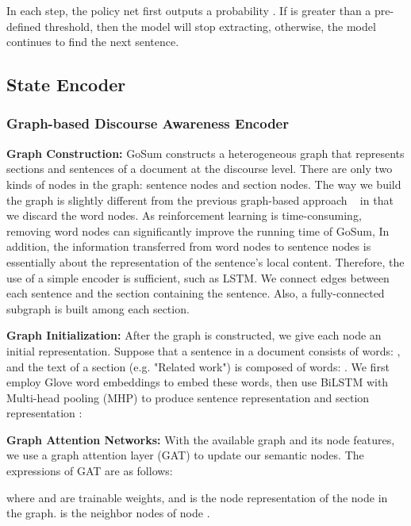 \documentclass[11pt,a4paper]{article}
\begin{document}
In each step, the policy net first outputs a probability . If  is greater than a pre-defined threshold, then the model will stop extracting, otherwise, the model continues to find the next sentence.


\subsection{State Encoder}

\subsubsection{Graph-based Discourse Awareness Encoder}

\noindent \textbf{Graph Construction:}
GoSum constructs a heterogeneous graph that represents sections and sentences of a document at the discourse level.
There are only two kinds of nodes in the graph: sentence nodes and section nodes.
The way we build the graph is slightly different from the previous graph-based approach ~\cite{discourse_2021,hsg_2020,hahsum_2020} in that we discard the word nodes.
As reinforcement learning is  time-consuming, removing word nodes can significantly improve the running time  of GoSum, 
In addition, the information transferred from word nodes to sentence nodes is essentially about the representation of the sentence's local content.  Therefore, the use of a simple encoder is sufficient, such as LSTM.
We connect edges between each sentence and the section containing the sentence.
Also, a fully-connected subgraph is built among each section.


\noindent \textbf{Graph Initialization:}
After the graph is constructed, we give each node an initial representation.
Suppose that  a sentence in a document consists of  words: , and the text of a section (e.g. "Related work") is composed of  words: .
We   first employ  Glove\cite{glove_2014} word embeddings to embed these words, then use BiLSTM \cite{lstm_1997} with Multi-head pooling (MHP) to produce sentence representation  and section representation :




\noindent \textbf{Graph Attention Networks:}
With the available graph  and its node features, we use a graph attention layer (GAT) \cite{gat_2017} to update our semantic nodes. The expressions of GAT are as follows:



where  and  are trainable weights, and  is the node representation of the  node in the graph.  is the neighbor nodes of node .
\end{document}
